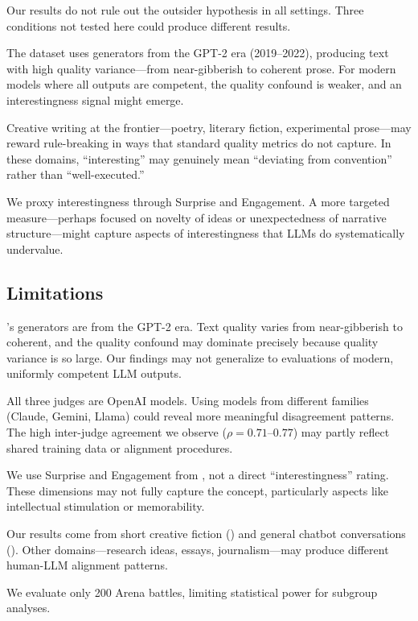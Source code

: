 Our results do not rule out the outsider hypothesis in all settings.
Three conditions not tested here could produce different results.

The \hanna dataset uses generators from the GPT-2 era (2019--2022), producing text with high quality variance---from near-gibberish to coherent prose.
For modern models where all outputs are competent, the quality confound is weaker, and an interestingness signal might emerge.

Creative writing at the frontier---poetry, literary fiction, experimental prose---may reward rule-breaking in ways that standard quality metrics do not capture.
In these domains, ``interesting'' may genuinely mean ``deviating from convention'' rather than ``well-executed.''

We proxy interestingness through Surprise and Engagement.
A more targeted measure---perhaps focused on novelty of ideas or unexpectedness of narrative structure---might capture aspects of interestingness that LLMs do systematically undervalue.

\subsection{Limitations}
\label{sec:limitations}

\hanna's generators are from the GPT-2 era.
Text quality varies from near-gibberish to coherent, and the quality confound may dominate precisely because quality variance is so large.
Our findings may not generalize to evaluations of modern, uniformly competent LLM outputs.

All three judges are OpenAI models.
Using models from different families (Claude, Gemini, Llama) could reveal more meaningful disagreement patterns.
The high inter-judge agreement we observe ($\rho = 0.71$--$0.77$) may partly reflect shared training data or alignment procedures.

We use Surprise and Engagement from \hanna, not a direct ``interestingness'' rating.
These dimensions may not fully capture the concept, particularly aspects like intellectual stimulation or memorability.

Our results come from short creative fiction (\hanna) and general chatbot conversations (\arena).
Other domains---research ideas, essays, journalism---may produce different human-LLM alignment patterns.

We evaluate only 200 Arena battles, limiting statistical power for subgroup analyses.
